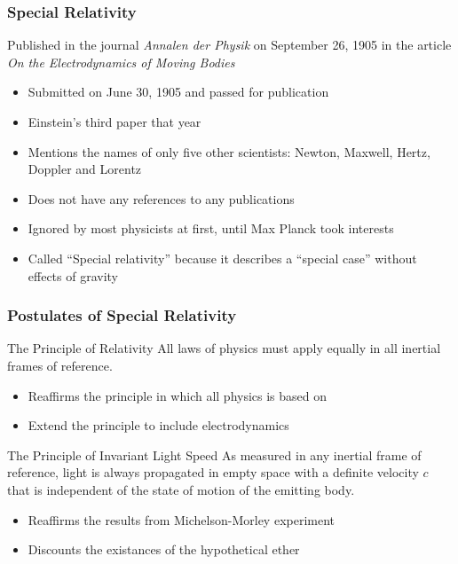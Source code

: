 \documentclass[12pt,compress,aspectratio=169]{beamer}
\begin{document}
\begin{frame}
  \frametitle{Special Relativity}
  \vspace{.15in}Published in the journal \emph{Annalen der Physik} on September
  26, 1905 in the article \emph{On the Electrodynamics of Moving Bodies}
  \begin{itemize}
  \item Submitted on June 30, 1905 and passed for publication
  \item Einstein's third paper that year
  \item Mentions the names of only five other scientists: Newton, Maxwell,
    Hertz, Doppler and Lorentz
  \item Does not have any references to any publications
  \item Ignored by most physicists at first, until Max Planck took interests
  \item Called ``Special relativity'' because it describes a ``special case''
    without effects of gravity
  \end{itemize}
\end{frame}

\begin{frame}
  \frametitle{Postulates of Special Relativity}
  \begin{block}{The Principle of Relativity}
    All laws of physics must apply equally in all inertial frames of reference.
  \end{block}
  \begin{itemize}
  \item Reaffirms the principle in which all physics is based on
  \item Extend the principle to include electrodynamics
  \end{itemize}

  \vspace{.1in}
  \begin{block}{The Principle of Invariant Light Speed}
    As measured in any inertial frame of reference, light is always propagated
    in empty space with a definite velocity $c$ that is independent of the
    state of motion of the emitting body.
  \end{block}
  \begin{itemize}
  \item Reaffirms the results from Michelson-Morley experiment
  \item Discounts the existances of the  hypothetical ether
  \end{itemize}
\end{frame}
\end{document}
